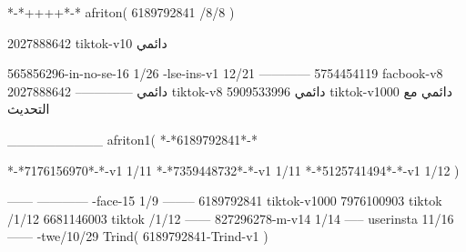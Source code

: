 *-*++++*-*
afriton(
6189792841 /8/8
)

2027888642 tiktok-v10
دائمي

565856296-in-no-se-16 1/26
-lse-ins-v1 12/21
------------
5754454119 facbook-v8
دائمي
--------------
2027888642 tiktok-v8
دائمي
5909533996 tiktok-v1000
دائمي مع التحديث

__________
afriton1(
*-*6189792841*-*

*-*7176156970*-*-v1 1/11
*-*7359448732*-*-v1 1/11
*-*5125741494*-*-v1 1/12
)

------
------------
-face-15 1/9
--------
6189792841 tiktok-v1000
7976100903 tiktok /1/12
6681146003 tiktok /1/12
------
827296278-m-v14 1/14
-----
userinsta 11/16
------
-twe/10/29
Trind(
6189792841-Trind-v1 
)
